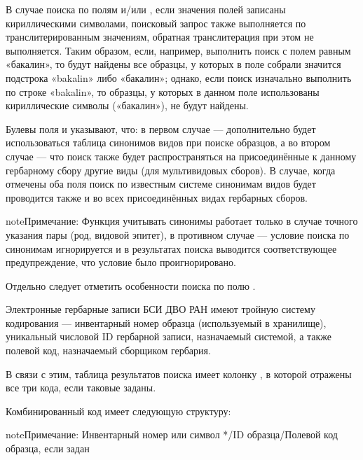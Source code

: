 \documentclass[letterpaper,10pt,russian]{sphinxmanual}
\begin{document}
В случае поиска по полям  и/или , если значения
полей записаны кириллическими символами, поисковый запрос также
выполняется по транслитерированным  значениям, обратная транслитерация при этом не выполняется.
Таким образом, если, например, выполнить поиск с полем  равным «бакалин»,
то будут найдены все образцы, у которых в поле собрали значится подстрока «bakalin» либо «бакалин»; однако,
если поиск изначально выполнить по строке «bakalin», то образцы, у которых в данном поле
использованы кириллические символы («бакалин»), не будут найдены.

Булевы поля  и 
указывают, что: в первом случае — дополнительно будет использоваться
таблица синонимов видов при поиске образцов, а во втором случае — что поиск
также будет распространяться на присоединённые к данному гербарному сбору
другие виды (для мультивидовых сборов).
В случае, когда отмечены оба поля поиск по известным системе синонимам видов будет
проводится также и во всех присоединённых видах гербарных сборов.

\begin{sphinxadmonition}{note}{Примечание:}
Функция учитывать синонимы работает только в случае точного
указания пары (род, видовой эпитет), в противном случае — условие поиска по
синонимам игнорируется и в результатах поиска выводится соответствующее предупреждение,
что условие было проигнорировано.
\end{sphinxadmonition}

Отдельно следует отметить особенности поиска по  полю .

Электронные гербарные записи БСИ ДВО РАН
имеют тройную систему кодирования — инвентарный номер образца (используемый в хранилище), уникальный числовой ID
гербарной записи, назначаемый системой, а также полевой код, назначаемый сборщиком гербария.

В связи с этим, таблица результатов поиска имеет колонку , в
которой отражены все три кода, если таковые заданы.

Комбинированный код имеет следующую структуру:

\begin{sphinxadmonition}{note}{Примечание:}
Инвентарный номер или символ */ID образца/Полевой код образца, если задан
\end{sphinxadmonition}
\end{document}
